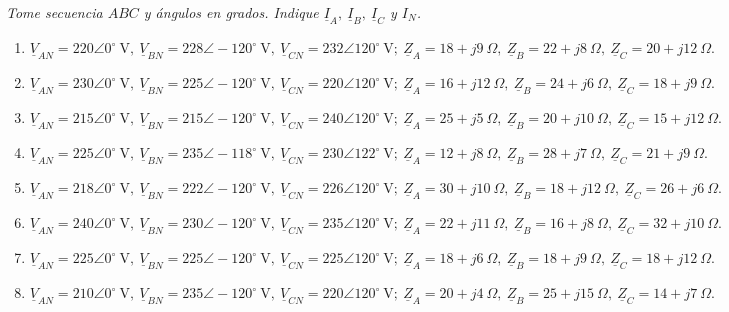\documentclass[../main]{subfiles}
\begin{document}
\textit{Tome secuencia $ABC$ y ángulos en grados. Indique $\underline{I}_A,\ \underline{I}_B,\ \underline{I}_C$ y $I_N$.}
\begin{enumerate}
\item $\underline{V}_{AN}=220\angle 0^\circ\ \text{V},\ \underline{V}_{BN}=228\angle -120^\circ\ \text{V},\ \underline{V}_{CN}=232\angle 120^\circ\ \text{V};\ \underline{Z}_A=18+j9\ \Omega,\ \underline{Z}_B=22+j8\ \Omega,\ \underline{Z}_C=20+j12\ \Omega.$

\item $\underline{V}_{AN}=230\angle 0^\circ\ \text{V},\ \underline{V}_{BN}=225\angle -120^\circ\ \text{V},\ \underline{V}_{CN}=220\angle 120^\circ\ \text{V};\ \underline{Z}_A=16+j12\ \Omega,\ \underline{Z}_B=24+j6\ \Omega,\ \underline{Z}_C=18+j9\ \Omega.$

\item $\underline{V}_{AN}=215\angle 0^\circ\ \text{V},\ \underline{V}_{BN}=215\angle -120^\circ\ \text{V},\ \underline{V}_{CN}=240\angle 120^\circ\ \text{V};\ \underline{Z}_A=25+j5\ \Omega,\ \underline{Z}_B=20+j10\ \Omega,\ \underline{Z}_C=15+j12\ \Omega.$

\item $\underline{V}_{AN}=225\angle 0^\circ\ \text{V},\ \underline{V}_{BN}=235\angle -118^\circ\ \text{V},\ \underline{V}_{CN}=230\angle 122^\circ\ \text{V};\ \underline{Z}_A=12+j8\ \Omega,\ \underline{Z}_B=28+j7\ \Omega,\ \underline{Z}_C=21+j9\ \Omega.$

\item $\underline{V}_{AN}=218\angle 0^\circ\ \text{V},\ \underline{V}_{BN}=222\angle -120^\circ\ \text{V},\ \underline{V}_{CN}=226\angle 120^\circ\ \text{V};\ \underline{Z}_A=30+j10\ \Omega,\ \underline{Z}_B=18+j12\ \Omega,\ \underline{Z}_C=26+j6\ \Omega.$

\item $\underline{V}_{AN}=240\angle 0^\circ\ \text{V},\ \underline{V}_{BN}=230\angle -120^\circ\ \text{V},\ \underline{V}_{CN}=235\angle 120^\circ\ \text{V};\ \underline{Z}_A=22+j11\ \Omega,\ \underline{Z}_B=16+j8\ \Omega,\ \underline{Z}_C=32+j10\ \Omega.$

\item $\underline{V}_{AN}=225\angle 0^\circ\ \text{V},\ \underline{V}_{BN}=225\angle -120^\circ\ \text{V},\ \underline{V}_{CN}=225\angle 120^\circ\ \text{V};\ \underline{Z}_A=18+j6\ \Omega,\ \underline{Z}_B=18+j9\ \Omega,\ \underline{Z}_C=18+j12\ \Omega.$

\item $\underline{V}_{AN}=210\angle 0^\circ\ \text{V},\ \underline{V}_{BN}=235\angle -120^\circ\ \text{V},\ \underline{V}_{CN}=220\angle 120^\circ\ \text{V};\ \underline{Z}_A=20+j4\ \Omega,\ \underline{Z}_B=25+j15\ \Omega,\ \underline{Z}_C=14+j7\ \Omega.$


\end{enumerate}
\end{document}
